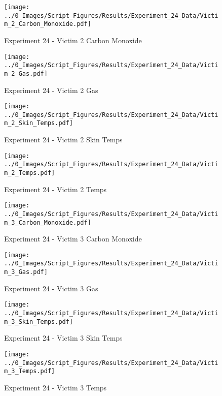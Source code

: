 	\begin{figure}[H]
		\centering
		\texttt{[image: ../0\_Images/Script\_Figures/Results/Experiment\_24\_Data/Victim\_2\_Carbon\_Monoxide.pdf]}
		\caption[]{Experiment 24 - Victim 2 Carbon Monoxide}
	\end{figure}
 
	\clearpage

	\begin{figure}[H]
		\centering
		\texttt{[image: ../0\_Images/Script\_Figures/Results/Experiment\_24\_Data/Victim\_2\_Gas.pdf]}
		\caption[]{Experiment 24 - Victim 2 Gas}
	\end{figure}
 

	\begin{figure}[H]
		\centering
		\texttt{[image: ../0\_Images/Script\_Figures/Results/Experiment\_24\_Data/Victim\_2\_Skin\_Temps.pdf]}
		\caption[]{Experiment 24 - Victim 2 Skin Temps}
	\end{figure}
 
	\clearpage

	\begin{figure}[H]
		\centering
		\texttt{[image: ../0\_Images/Script\_Figures/Results/Experiment\_24\_Data/Victim\_2\_Temps.pdf]}
		\caption[]{Experiment 24 - Victim 2 Temps}
	\end{figure}
 

	\begin{figure}[H]
		\centering
		\texttt{[image: ../0\_Images/Script\_Figures/Results/Experiment\_24\_Data/Victim\_3\_Carbon\_Monoxide.pdf]}
		\caption[]{Experiment 24 - Victim 3 Carbon Monoxide}
	\end{figure}
 
	\clearpage

	\begin{figure}[H]
		\centering
		\texttt{[image: ../0\_Images/Script\_Figures/Results/Experiment\_24\_Data/Victim\_3\_Gas.pdf]}
		\caption[]{Experiment 24 - Victim 3 Gas}
	\end{figure}
 

	\begin{figure}[H]
		\centering
		\texttt{[image: ../0\_Images/Script\_Figures/Results/Experiment\_24\_Data/Victim\_3\_Skin\_Temps.pdf]}
		\caption[]{Experiment 24 - Victim 3 Skin Temps}
	\end{figure}
 
	\clearpage

	\begin{figure}[H]
		\centering
		\texttt{[image: ../0\_Images/Script\_Figures/Results/Experiment\_24\_Data/Victim\_3\_Temps.pdf]}
		\caption[]{Experiment 24 - Victim 3 Temps}
	\end{figure}
 

